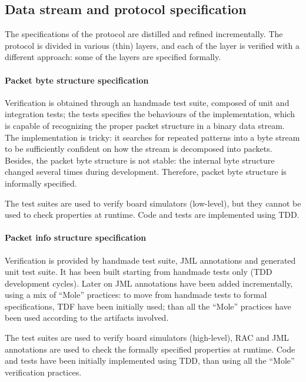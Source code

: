 \documentclass{article}
\begin{document}
\subsection{Data stream and protocol specification}
\label{subsec:data_stream_and_protocol_specification}

The specifications of the protocol are distilled and refined incrementally.
The protocol is divided in various (thin) layers, and each of the layer is verified with a different approach: some of the layers are specified formally. 

\paragraph*{Packet byte structure specification}

Verification is obtained through an handmade test suite, composed of unit and integration tests; the tests specifies the behaviours of the implementation, which is capable of recognizing the proper packet structure in a binary data stream. 
The implementation is tricky: it searches for repeated patterns into a byte stream to be sufficiently confident on how the stream is decomposed into packets.
Besides, the packet byte structure is not stable: the internal byte structure changed several times during development.
Therefore, packet byte structure is informally specified.

The test suites are used to verify board simulators (low-level), but they cannot be used to check properties at runtime.
Code and tests are implemented using TDD.

\paragraph*{Packet info structure specification}

Verification is provided by handmade test suite, JML annotations and generated unit test suite. 
It has been built starting from handmade tests only (TDD development cycles).
Later on JML annotations have been added incrementally, using a mix of ``Mole'' practices: to move from handmade tests to formal specifications, TDF have been initially used; than all the ``Mole'' practices have been used according to the artifacts involved.

The test suites are used to verify board simulators (high-level), RAC and JML annotations are used to check the formally specified properties at runtime.
Code and tests have been initially implemented using TDD, than using all the ``Mole'' verification practices.
\end{document}

